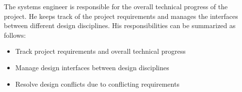 The systems engineer is responsible for the overall technical progress of the project. He keeps track of the project requirements and manages the interfaces between different design disciplines. His responsibilities can be summarized as follows:

\begin{itemize}
\item Track project requirements and overall technical progress
\item Manage design interfaces between design disciplines
\item Resolve design conflicts due to conflicting requirements 
\end{itemize}
